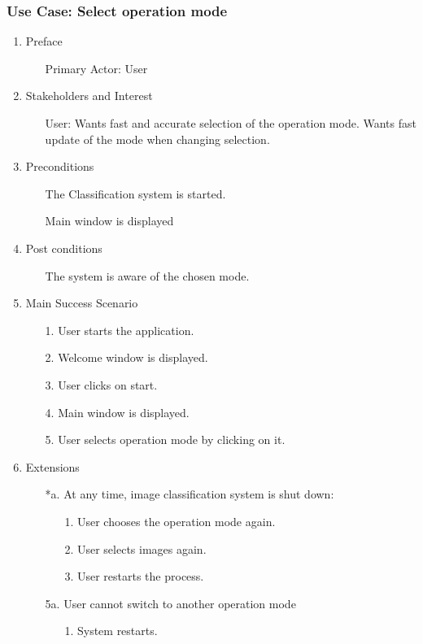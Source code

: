 \documentclass[parskip=full]{scrartcl}
\begin{document}
\pagebreak

\subsubsection {Use Case: Select operation mode}

\begin{enumerate}
	\item Preface
	\begin{itemize} [nosep]
		\item[] Primary Actor: User
	\end{itemize}
	\item Stakeholders and Interest
	\begin{itemize} [nosep]
		\item[] User: Wants fast and accurate selection of the operation mode. Wants fast update of the mode when changing selection.
	\end{itemize}
	\item Preconditions
	\begin{itemize} [nosep]
		\item[] The Classification system is started.
		\item[] Main window is displayed
	\end{itemize}
	\item Post conditions
	\begin{itemize} [nosep]
		\item[] The system is aware of the chosen mode.
	\end{itemize}
	\item Main Success Scenario
	\begin{itemize} [nosep]
		\item[1.] User starts the application.
		\item[2.] Welcome window is displayed.
		\item[3.] User clicks on start.
		\item[4.] Main window is displayed.
		\item[5.] User selects operation mode by clicking on it.
	\end{itemize}
	\item Extensions
	\begin{itemize} [nosep]
		\item[*a.] At any time, image classification system is shut down:
		\begin{itemize} [nosep]
			\item[1.] User chooses the operation mode again.
			\item[2.] User selects images again.
			\item[3.] User restarts the process.
		\end{itemize}
		\item[5a.] User cannot switch to another operation mode
		\begin{itemize} [nosep]
			\item[1.] System restarts.
		\end{itemize}
	\end{itemize}
\end{enumerate}
\end{document}
